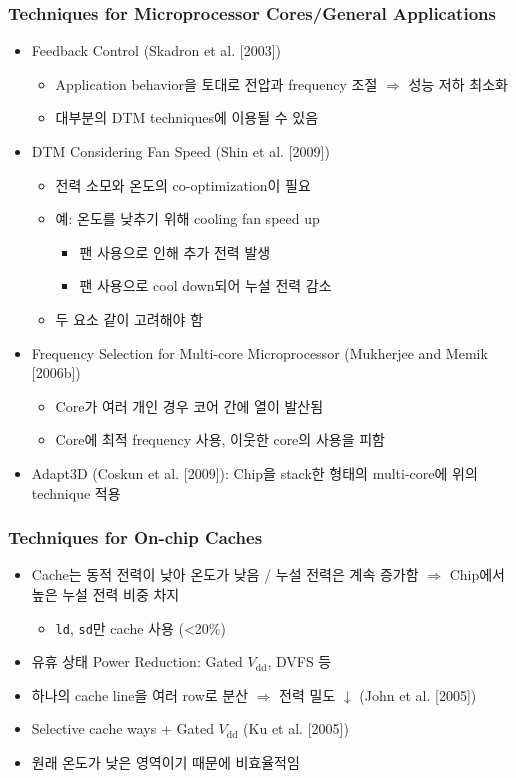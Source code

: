 \subsubsection*{Techniques for Microprocessor Cores/General Applications}
\begin{itemize}
    \item Feedback Control (Skadron et al. [2003])
    \begin{itemize}
        \item Application behavior을 토대로 전압과 frequency 조절 $\Rightarrow$ 성능 저하 최소화
        \item 대부분의 DTM techniques에 이용될 수 있음
    \end{itemize}
    \item DTM Considering Fan Speed (Shin et al. [2009])
    \begin{itemize}
        \item 전력 소모와 온도의 co-optimization이 필요
        \item 예: 온도를 낮추기 위해 cooling fan speed up
        \begin{itemize}
            \item 팬 사용으로 인해 추가 전력 발생
            \item 팬 사용으로 cool down되어 누설 전력 감소
        \end{itemize}
        \item 두 요소 같이 고려해야 함
    \end{itemize}
    \item Frequency Selection for Multi-core Microprocessor (Mukherjee and Memik [2006b])
    \begin{itemize}
        \item Core가 여러 개인 경우 코어 간에 열이 발산됨
        \item Core에 최적 frequency 사용, 이웃한 core의 사용을 피함
    \end{itemize}
    \item Adapt3D (Coskun et al. [2009]): Chip을 stack한 형태의 multi-core에 위의 technique 적용
\end{itemize}

\subsubsection*{Techniques for On-chip Caches}
\begin{itemize}
    \item Cache는 동적 전력이 낮아 온도가 낮음 / 누설 전력은 계속 증가함 $\Rightarrow$ Chip에서 높은 누설 전력 비중 차지
    \begin{itemize}
        \item \texttt{ld}, \texttt{sd}만 cache 사용 (\textless 20\%)
    \end{itemize}
    \item 유휴 상태 Power Reduction: Gated $V_{\mathrm{dd}}$, DVFS 등
    \item 하나의 cache line을 여러 row로 분산 $\Rightarrow$ 전력 밀도 $\downarrow$ (John et al. [2005])
    \item Selective cache ways + Gated $V_{\mathrm{dd}}$ (Ku et al. [2005])
    \item 원래 온도가 낮은 영역이기 때문에 비효율적임
\end{itemize}
